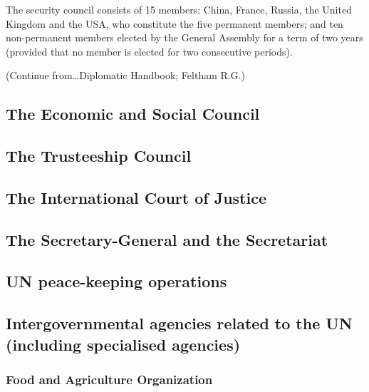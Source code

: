 \documentclass[
  openany]{book}
\begin{document}
The security council consists of 15 members: China, France, Russia, the United Kingdom and the USA, who constitute the five permanent members; and ten non-permanent members elected by the General Assembly for a term of two years (provided that no member is elected for two consecutive periods).

(Continue from\ldots Diplomatic Handbook; Feltham R.G.)

\hypertarget{the-economic-and-social-council}{%
\subsection{The Economic and Social Council}\label{the-economic-and-social-council}}

\hypertarget{the-trusteeship-council}{%
\subsection{The Trusteeship Council}\label{the-trusteeship-council}}

\hypertarget{the-international-court-of-justice}{%
\subsection{The International Court of Justice}\label{the-international-court-of-justice}}

\hypertarget{the-secretary-general-and-the-secretariat}{%
\subsection{The Secretary-General and the Secretariat}\label{the-secretary-general-and-the-secretariat}}

\hypertarget{un-peace-keeping-operations}{%
\subsection{UN peace-keeping operations}\label{un-peace-keeping-operations}}

\hypertarget{intergovernmental-agencies-related-to-the-un-including-specialised-agencies}{%
\subsection{Intergovernmental agencies related to the UN (including specialised agencies)}\label{intergovernmental-agencies-related-to-the-un-including-specialised-agencies}}

\hypertarget{food-and-agriculture-organization}{%
\subsubsection{Food and Agriculture Organization}\label{food-and-agriculture-organization}}
\end{document}
